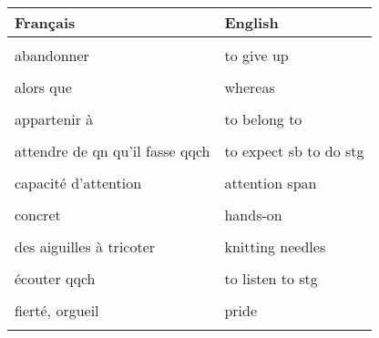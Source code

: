 \documentclass[
  10pt,
]{article}
\begin{document}
\begin{longtable}{ll}
\toprule
Français & English\\
\midrule
\cellcolor{gray!6}{15 sur 20} & \cellcolor{gray!6}{15 out of 20}\\

abandonner & to give up\\

\cellcolor{gray!6}{adhérer à qqch} & \cellcolor{gray!6}{to subscribe to stg}\\

alors que & whereas\\

\cellcolor{gray!6}{améliorer, faire des progrès} & \cellcolor{gray!6}{to improve}\\

appartenir à & to belong to\\

\cellcolor{gray!6}{approvisionner, fournir} & \cellcolor{gray!6}{to supply}\\

attendre de qn qu'il fasse qqch & to expect sb to do stg\\

\cellcolor{gray!6}{bien que} & \cellcolor{gray!6}{although}\\

capacité d'attention & attention span\\

\cellcolor{gray!6}{cautionner} & \cellcolor{gray!6}{to endorse}\\

concret & hands-on\\

\cellcolor{gray!6}{de la boue} & \cellcolor{gray!6}{mud}\\

des aiguilles à tricoter & knitting needles\\

\cellcolor{gray!6}{du mobilier, des meubles} & \cellcolor{gray!6}{furniture}\\

écouter qqch & to listen to stg\\

\cellcolor{gray!6}{expliciter, détailler} & \cellcolor{gray!6}{to spell out}\\

fierté, orgueil & pride\\

\cellcolor{gray!6}{fonder} & \cellcolor{gray!6}{to found}\\


\end{longtable}
\end{document}
